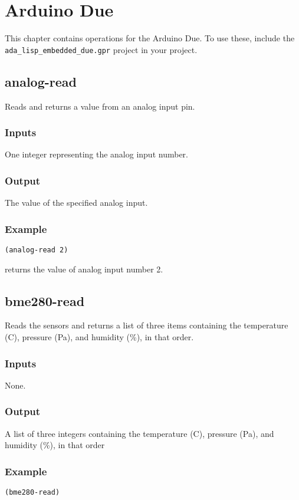 \documentclass[10pt, openany]{book}
\newcommand{\package}[1]{\texttt{#1}}
\begin{document}
\chapter{Arduino Due}
This chapter contains operations for the Arduino Due.  To use these, include the \package{ada\_lisp\_embedded\_due.gpr} project in your project.

\section{analog-read}
Reads and returns a value from an analog input pin.
\subsection{Inputs}
One integer representing the analog input number.
\subsection{Output}
The value of the specified analog input.
\subsection{Example}
\begin{lstlisting}
(analog-read 2)
\end{lstlisting}
returns the value of analog input  number 2.

\section{bme280-read}
Reads the sensors and returns a list of three items containing the temperature (\degree{}C), pressure (Pa), and humidity (\%), in that order.
\subsection{Inputs}
None.
\subsection{Output}
A list of three integers containing the temperature (\degree{}C), pressure (Pa), and humidity (\%), in that order
\subsection{Example}
\begin{lstlisting}
(bme280-read)
\end{lstlisting}
\end{document}
